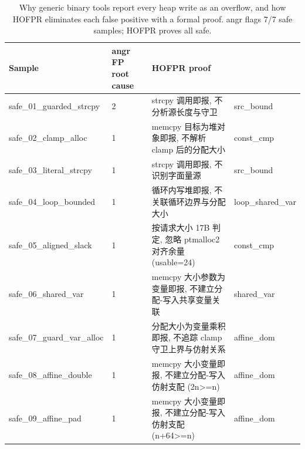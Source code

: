 \begin{table}[t]
\centering
\small
\begin{tabular}{lp{5.2cm}p{4.2cm}}
\toprule
Sample & angr FP root cause & HOFPR proof \\
\midrule
  safe_01_guarded_strcpy & 2 & strcpy 调用即报, 不分析源长度与守卫 & src_bound \\
  safe_02_clamp_alloc & 1 & memcpy 目标为堆对象即报, 不解析 clamp 后的分配大小 & const_cmp \\
  safe_03_literal_strcpy & 1 & strcpy 调用即报, 不识别字面量源 & src_bound \\
  safe_04_loop_bounded & 1 & 循环内写堆即报, 不关联循环边界与分配大小 & loop_shared_var \\
  safe_05_aligned_slack & 1 & 按请求大小 17B 判定, 忽略 ptmalloc2 对齐余量 (usable=24) & const_cmp \\
  safe_06_shared_var & 1 & memcpy 大小参数为变量即报, 不建立分配-写入共享变量关联 & shared_var \\
  safe_07_guard_var_alloc & 1 & 分配大小为变量乘积即报, 不追踪 clamp 守卫上界与仿射关系 & affine_dom \\
  safe_08_affine_double & 1 & memcpy 大小变量即报, 不建立分配-写入仿射支配 (2n>=n) & affine_dom \\
  safe_09_affine_pad & 1 & memcpy 大小变量即报, 不建立分配-写入仿射支配 (n+64>=n) & affine_dom \\
\bottomrule
\end{tabular}
\caption{Why generic binary tools report every heap write as an
overflow, and how HOFPR eliminates each false positive with a
formal proof. angr flags 7/7 safe samples; HOFPR proves all safe.}
\label{tab:fp_cause}
\end{table}
